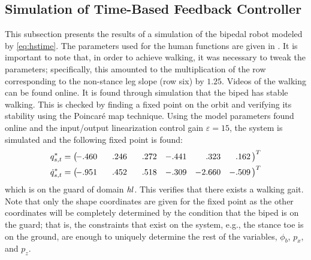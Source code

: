 \subsection{Simulation of Time-Based Feedback Controller} \label{sec:timesim} \noindent
This subsection presents the results of a simulation of the bipedal robot modeled by \eqref{eq:hstime}. The parameters used for the human functions are given in . It is important to note that, in order to achieve walking, it was necessary to tweak the parameters; specifically, this amounted to the multiplication of the row corresponding to the non-stance leg slope (row six) by $1.25$. Videos of the walking can be found online.\cite{url:robotica_2011_spja_01}\xspace It is found through simulation that the biped has stable walking. This is checked by finding a fixed point on the orbit and verifying its stability using the Poincar\'{e} map technique.\cite{PC89}\xspace Using the model parameters found online\cite{url:robotica_2011_spja_01}\xspace and the input/output linearization control gain $\varepsilon = 15$, the system is simulated and the following fixed point is found:
\begin{align}
  q_{s,t}^{*} =
  \left(\!\!\!\!\begin{array}{c c c c c c}
    -.460 & \hphantom{-}.246 & \hphantom{-}.272 & -.441 & \hphantom{-0}.323 & \hphantom{-}.162
  \end{array}\!\!\right)^T\\
  {\dot q}_{s,t}^{*} =
  \left(\!\!\!\!\begin{array}{c c c c c c}
    -.951 & \hphantom{-}.452 & \hphantom{-}.518 & -.309 & -2.660 & -.509
  \end{array}\!\!\right)^T
\end{align}
which is on the guard of domain $\mathit{hl}$. This verifies that there exists a walking gait. Note that only the shape coordinates are given for the fixed point as the other coordinates will be completely determined by the condition that the biped is on the guard; that is, the constraints that exist on the system, e.g., the stance toe is on the ground, are enough to uniquely determine the rest of the variables, $\phi_b$, $p_x$, and $p_z$.

